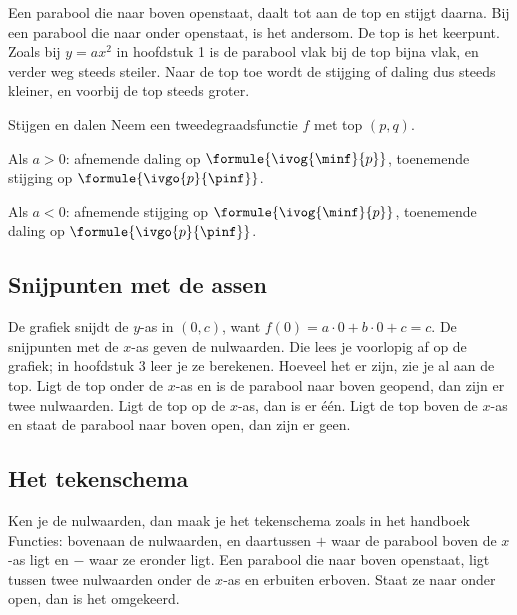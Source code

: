 Een parabool die naar boven openstaat, daalt tot aan de top en stijgt daarna. Bij een parabool die naar onder openstaat, is het andersom. De top is het keerpunt. Zoals bij $y = ax^2$ in hoofdstuk 1 is de parabool vlak bij de top bijna vlak, en verder weg steeds steiler. Naar de top toe wordt de stijging of daling dus steeds kleiner, en voorbij de top steeds groter.

\begin{theorie}
\begin{stelling}{Stijgen en dalen}
Neem een tweedegraadsfunctie $f$ met top $(p, q)$.

\qquad Als $a > 0$: afnemende daling op $\formule{\ivog{\minf}{p}}$, toenemende stijging op $\formule{\ivgo{p}{\pinf}}$.

\qquad Als $a < 0$: afnemende stijging op $\formule{\ivog{\minf}{p}}$, toenemende daling op $\formule{\ivgo{p}{\pinf}}$.
\end{stelling}
\end{theorie}

\subsection{Snijpunten met de assen}

De grafiek snijdt de $y$-as in $(0, c)$, want $f(0) = a \cdot 0 + b \cdot 0 + c = c$. De snijpunten met de $x$-as geven de nulwaarden. Die lees je voorlopig af op de grafiek; in hoofdstuk 3 leer je ze berekenen. Hoeveel het er zijn, zie je al aan de top. Ligt de top onder de $x$-as en is de parabool naar boven geopend, dan zijn er twee nulwaarden. Ligt de top op de $x$-as, dan is er één. Ligt de top boven de $x$-as en staat de parabool naar boven open, dan zijn er geen.

\subsection{Het tekenschema}

Ken je de nulwaarden, dan maak je het tekenschema zoals in het handboek Functies: bovenaan de nulwaarden, en daartussen $+$ waar de parabool boven de $x$-as ligt en $-$ waar ze eronder ligt. Een parabool die naar boven openstaat, ligt tussen twee nulwaarden onder de $x$-as en erbuiten erboven. Staat ze naar onder open, dan is het omgekeerd.


